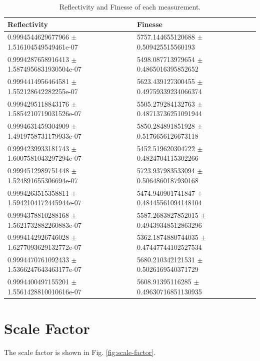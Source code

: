 \documentclass[a4paper]{report}
\numberwithin{equation}{section}
\begin{document}
\begin{table}[!ht]
    \centering
    \begin{tabular}{|l|l|}
    \hline
        Reflectivity & Finesse \\ \hline
        0.9994544629677966 $\pm$ 1.516104549549461e-07 & 5757.144655120688 $\pm$ 0.509425515560193 \\ \hline
        0.9994287658916413 $\pm$ 1.5874956831930504e-07 & 5498.087713979654 $\pm$ 0.4865016395852652 \\ \hline
        0.9994414956464581 $\pm$ 1.552128642282255e-07 & 5623.439127300455 $\pm$ 0.49759339234066374 \\ \hline
        0.9994295118843176 $\pm$ 1.5854210719031526e-07 & 5505.279284132763 $\pm$ 0.48713736251091944 \\ \hline
        0.9994631459304909 $\pm$ 1.4919758731179933e-07 & 5850.284891851928 $\pm$ 0.5176656126673118 \\ \hline
        0.9994239933181743 $\pm$ 1.6007581043297294e-07 & 5452.519620304722 $\pm$ 0.4824704115302266 \\ \hline
        0.9994512989751448 $\pm$ 1.524891655306694e-07 & 5723.937983533094 $\pm$ 0.5064860187930168 \\ \hline
        0.9994263515358811 $\pm$ 1.5942104172445944e-07 & 5474.940901741847 $\pm$ 0.48445561094148104 \\ \hline
        0.9994378810288168 $\pm$ 1.5621732882260883e-07 & 5587.2683827852015 $\pm$ 0.49439348512863296 \\ \hline
        0.9994142926746028 $\pm$ 1.6277093629132772e-07 & 5362.1874880744035 $\pm$ 0.47447744102527534 \\ \hline
        0.9994470761092433 $\pm$ 1.5366247643463177e-07 & 5680.210342121531 $\pm$ 0.5026169540371729 \\ \hline
        0.9994400497155201 $\pm$ 1.5561428810010616e-07 & 5608.91395116285 $\pm$ 0.49630716851130935 \\ \hline
    \end{tabular}
    \caption{Reflectivity and Finesse of each measurement.}
    \label{tab:ref-fin}
\end{table}

\section{Scale Factor}
The scale factor is shown in Fig. \ref{fig:scale-factor}. 
\end{document}
